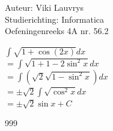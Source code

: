 \documentclass[a4paper]{article}
\begin{document}
  
\noindent \large Auteur: Viki	Lauvrys \\
\noindent \large Studierichting: Informatica\\
\noindent \large Oefeningenreeks 4A nr. 56.2\\

\medskip

\normalsize

$ \displaystyle\int \sqrt{1 + \cos (2x)} dx $ \\

$ = \displaystyle\int \sqrt{1 +1 -2 \sin^2 x} dx $ \\

$ = \displaystyle\int \left( \sqrt{2} \sqrt{1 - \sin^2 x} \right) dx $ \\

$ = \pm \sqrt{2} \displaystyle\int \sqrt{\cos^2 x} dx $ \\

$ = \pm \sqrt{2} \sin x + C $ \\

\begin{thebibliography}{999}
\end{thebibliography}
\end{document}

